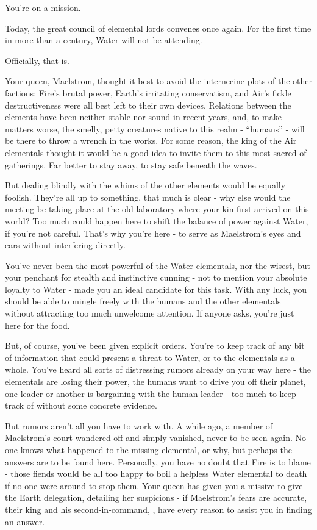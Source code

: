 \documentclass[char]{elementals}
\begin{document}
\name{\cMiniWater{}}


You’re on a mission. 

Today, the great council of elemental lords convenes once again. For the first time in more than a century, Water will not be attending.

Officially, that is.

Your queen, Maelstrom, thought it best to avoid the internecine plots of the other factions: Fire’s brutal power, Earth’s irritating conservatism, and Air’s fickle destructiveness were all best left to their own devices. Relations between the elements have been neither stable nor sound in recent years, and, to make matters worse, the smelly, petty creatures native to this realm - “humans” - will be there to throw a wrench in the works. For some reason, the king of the Air elementals thought it would be a good idea to invite them to this most sacred of gatherings. Far better to stay away, to stay safe beneath the waves.

But dealing blindly with the whims of the other elements would be equally foolish. They’re all up to something, that much is clear - why else would the meeting be taking place at the old laboratory where your kin first arrived on this world? Too much could happen here to shift the balance of power against Water, if you’re not careful. That’s why you’re here - to serve as Maelstrom’s eyes and ears without interfering directly.

You’ve never been the most powerful of the Water elementals, nor the wisest, but your penchant for stealth and instinctive cunning - not to mention your absolute loyalty to Water - made you an ideal candidate for this task. With any luck, you should be able to mingle freely with the humans and the other elementals without attracting too much unwelcome attention. If anyone asks, you’re just here for the food.

But, of course, you’ve been given explicit orders. You’re to keep track of any bit of information that could present a threat to Water, or to the elementals as a whole. You’ve heard all sorts of distressing rumors already on your way here - the elementals are losing their power, the humans want to drive you off their planet, one leader or another is bargaining with the human leader - too much to keep track of without some concrete evidence.

But rumors aren’t all you have to work with. A while ago, a member of Maelstrom’s court wandered off and simply vanished, never to be seen again. No one knows what happened to the missing elemental, or why, but perhaps the answers are to be found here. Personally, you have no doubt that Fire is to blame - those fiends would be all too happy to boil a helpless Water elemental to death if no one were around to stop them. Your queen has given you a missive to give the Earth delegation, detailing her suspicions - if Maelstrom's fears are accurate, their king and his second-in-command, , have every reason to assist you in finding an answer. 
\end{document}
